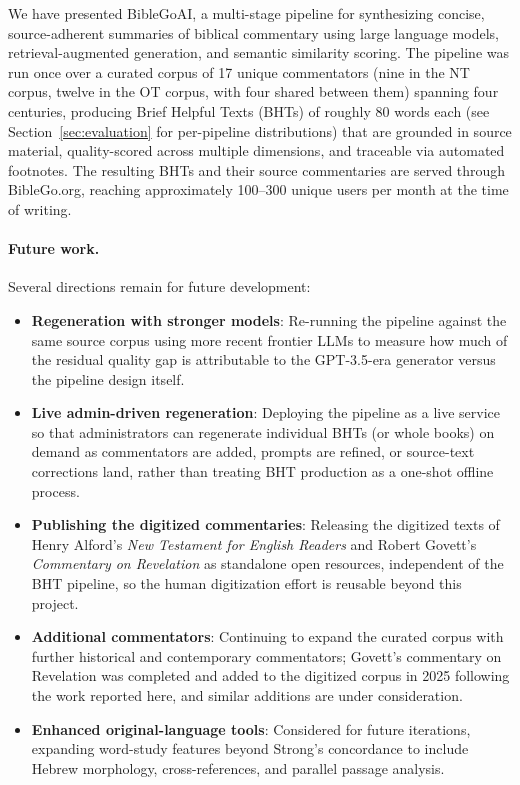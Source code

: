 We have presented BibleGoAI, a multi-stage pipeline for synthesizing concise, source-adherent summaries of biblical commentary using large language models, retrieval-augmented generation, and semantic similarity scoring. The pipeline was run once over a curated corpus of 17 unique commentators (nine in the NT corpus, twelve in the OT corpus, with four shared between them) spanning four centuries, producing Brief Helpful Texts (BHTs) of roughly 80 words each (see Section~\ref{sec:evaluation} for per-pipeline distributions) that are grounded in source material, quality-scored across multiple dimensions, and traceable via automated footnotes. The resulting BHTs and their source commentaries are served through BibleGo.org, reaching approximately 100--300 unique users per month at the time of writing.

\paragraph{Future work.}
Several directions remain for future development:
\begin{itemize}[nosep,leftmargin=*]
    \item \textbf{Regeneration with stronger models}: Re-running the pipeline against the same source corpus using more recent frontier LLMs to measure how much of the residual quality gap is attributable to the GPT-3.5-era generator versus the pipeline design itself.
    \item \textbf{Live admin-driven regeneration}: Deploying the pipeline as a live service so that administrators can regenerate individual BHTs (or whole books) on demand as commentators are added, prompts are refined, or source-text corrections land, rather than treating BHT production as a one-shot offline process.
    \item \textbf{Publishing the digitized commentaries}: Releasing the digitized texts of Henry Alford's \textit{New Testament for English Readers} and Robert Govett's \textit{Commentary on Revelation} as standalone open resources, independent of the BHT pipeline, so the human digitization effort is reusable beyond this project.
    \item \textbf{Additional commentators}: Continuing to expand the curated corpus with further historical and contemporary commentators; Govett's commentary on Revelation was completed and added to the digitized corpus in 2025 following the work reported here, and similar additions are under consideration.
    \item \textbf{Enhanced original-language tools}: Considered for future iterations, expanding word-study features beyond Strong's concordance to include Hebrew morphology, cross-references, and parallel passage analysis.
\end{itemize}

